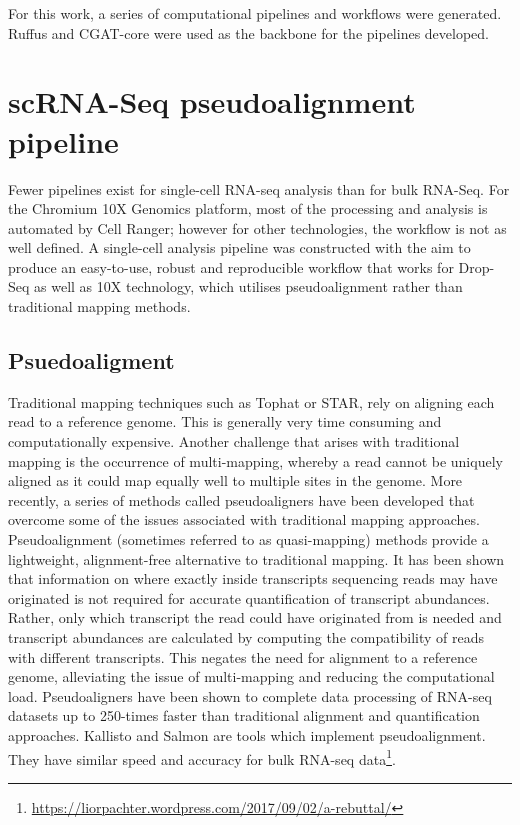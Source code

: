 For this work, a series of computational pipelines and workflows were generated.
Ruffus and CGAT-core\cite{cribbs2019cgat} were used as the backbone for the pipelines developed.

\section{scRNA-Seq pseudoalignment pipeline}\label{sec:scRNA_pipeline}
Fewer pipelines exist for single-cell RNA-seq analysis than for bulk RNA-Seq.
For the Chromium 10X Genomics platform, most of the processing and analysis is automated by Cell Ranger;
however for other technologies, the workflow is not as well defined.
A single-cell analysis pipeline was constructed with the aim to produce an easy-to-use, robust and reproducible workflow that works for Drop-Seq as well as 10X technology, which utilises pseudoalignment rather than traditional mapping methods.

\subsection{Psuedoaligment}
Traditional mapping techniques such as Tophat\cite{trapnell2009tophat} or STAR\cite{dobin2013star}, rely on aligning each read to a reference genome.
This is generally very time consuming and computationally expensive.
Another challenge that arises with traditional mapping is the occurrence of multi-mapping, whereby a read cannot be uniquely aligned as it could map equally well to multiple sites in the genome\cite{mortazavi2008mapping}.
More recently, a series of methods called pseudoaligners have been developed that overcome some of the issues associated with traditional mapping approaches.
Pseudoalignment (sometimes referred to as quasi-mapping) methods provide a lightweight, alignment-free alternative to traditional mapping.
It has been shown that information on where exactly inside transcripts sequencing reads may have originated is not required for accurate quantification of transcript abundances\cite{nicolae2010estimation}.
Rather, only which transcript the read could have originated from is needed and transcript abundances are calculated by computing the compatibility of reads with different transcripts.
This negates the need for alignment to a reference genome, alleviating the issue of multi-mapping and reducing the computational load.
Pseudoaligners have been shown to complete data processing of RNA-seq datasets up to 250-times faster than traditional alignment and quantification approaches\cite{bray2016near}.
Kallisto\cite{bray2016near} and Salmon\cite{patro2017salmon} are tools which implement pseudoalignment.
They have similar speed and accuracy for bulk RNA-seq data\footnote{\url{https://liorpachter.wordpress.com/2017/09/02/a-rebuttal/}}.

